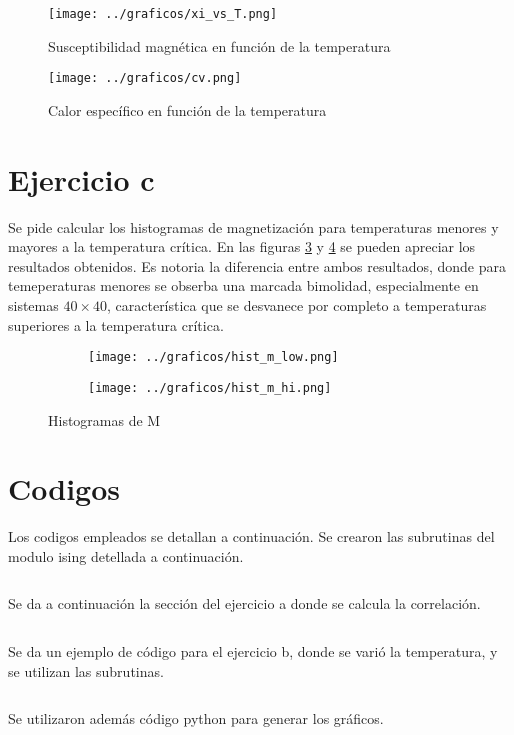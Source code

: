 \documentclass[a4paper,10pt]{paper}
\begin{document}
\begin{figure}[!h]
 \centering
 \texttt{[image: ../graficos/xi\_vs\_T.png]}
 \caption{Susceptibilidad magn\'etica en funci\'on de la temperatura}
 \label{fig:xi_vs_T}
\end{figure}

\begin{figure}[!h]
\centering
 \texttt{[image: ../graficos/cv.png]}
 \caption{Calor espec\'ifico en funci\'on de la temperatura}
 \label{fig:cv}
\end{figure}

\vspace{5cm}

\section{Ejercicio c}
Se pide calcular los histogramas de magnetizaci\'on para temperaturas menores y mayores a la temperatura cr\'itica.
En las figuras \ref{fig:sub1} y \ref{fig:sub2} se pueden apreciar los resultados obtenidos.
Es notoria la diferencia entre ambos resultados, donde para temeperaturas menores se obserba una marcada bimolidad, especialmente
en sistemas $40\times40$, caracter\'istica que se desvanece por completo a temperaturas superiores a la temperatura cr\'itica.

\begin{figure}[!h]
\centering
\begin{subfigure}%
  \centering
  \texttt{[image: ../graficos/hist\_m\_low.png]}
  \label{fig:sub1}
\end{subfigure}%
\begin{subfigure}%
  \centering
  \texttt{[image: ../graficos/hist\_m\_hi.png]}
  \label{fig:sub2}
\end{subfigure}
\caption{Histogramas de M}
\label{fig:test}
\end{figure}


\section{Codigos}
Los codigos empleados se detallan a continuaci\'on.
Se crearon las subrutinas del modulo ising detellada a continuaci\'on.
\inputminted[firstline=16, linenos, firstnumber=1]{fortran}{../ising.f90}
\vspace{5cm}

Se da a continuaci\'on la secci\'on del ejercicio a donde se calcula la correlaci\'on.
\inputminted[firstline=116, lastline=143, linenos, firstnumber=1]{fortran}{../ej1a.f90}
\vspace{5cm}

Se da un ejemplo de c\'odigo para el ejercicio b, donde se vari\'o la temperatura, y se 
utilizan las subrutinas.
\inputminted[firstline=16, linenos, firstnumber=1]{fortran}{../ej1b.f90}
\vspace{5cm}

Se utilizaron adem\'as c\'odigo python para generar los gr\'aficos.
\end{document}
